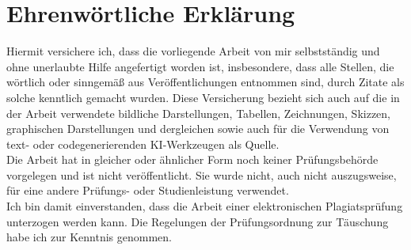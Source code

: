 \documentclass[a4paper, 11pt, german ]{article}
\def\True{1}
\begin{document}
\section*{Ehrenwörtliche Erklärung}
Hiermit versichere ich, dass die vorliegende Arbeit von mir selbstständig und ohne unerlaubte Hilfe
angefertigt worden ist, insbesondere, dass alle Stellen, die wörtlich oder sinngemäß aus
Veröffentlichungen entnommen sind, durch Zitate als solche kenntlich gemacht wurden.
Diese Versicherung bezieht sich auch auf die in der Arbeit verwendete bildliche Darstellungen,
Tabellen, Zeichnungen, Skizzen, graphischen Darstellungen und dergleichen sowie auch für die
Verwendung von text- oder codegenerierenden KI-Werkzeugen als Quelle.
\vspace{1ex}\\
Die Arbeit hat in gleicher oder ähnlicher Form noch keiner Prüfungsbehörde vorgelegen und ist nicht
veröffentlicht. Sie wurde nicht, auch nicht auszugsweise, für eine andere Prüfungs- oder
Studienleistung verwendet.
\vspace{1ex}\\
Ich bin damit einverstanden, dass die Arbeit einer elektronischen Plagiatsprüfung unterzogen werden
kann. Die Regelungen der Prüfungsordnung zur Täuschung habe ich zur Kenntnis genommen.


%
%
\end{document}
